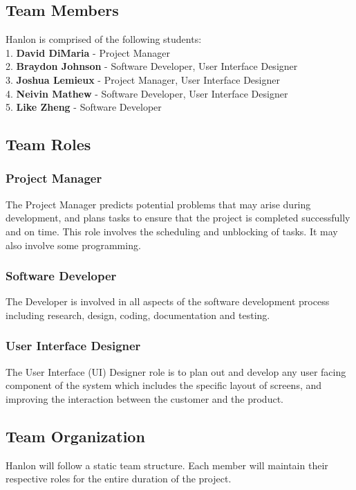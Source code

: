 \documentclass[12pt,letterpaper]{article}
\begin{document}
\subsection{Team Members}
Hanlon is comprised of the following students:\\
1. \textbf{\hspace*{5pt} David DiMaria} - Project Manager\\
2. \textbf{\hspace*{5pt}Braydon Johnson} - Software Developer, User Interface Designer\\
3. \textbf{\hspace*{5pt}Joshua Lemieux} - Project Manager, User Interface Designer\\
4. \textbf{\hspace*{5pt}Neivin Mathew} - Software Developer, User Interface Designer\\
5. \textbf{\hspace*{5pt}Like Zheng} - Software Developer

\subsection{Team Roles}
\subsubsection*{Project Manager}
The Project Manager predicts potential problems that may arise during development, and plans tasks to ensure that the project is completed successfully and on time. This role involves the scheduling and unblocking of tasks. It may also involve some programming.

\subsubsection*{Software Developer}
The Developer is involved in all aspects of the software development process including research, design, coding, documentation and testing.

\subsubsection*{User Interface Designer}
The User Interface (UI) Designer role is to plan out and develop any user facing component of the system which includes the specific layout of screens, and improving the interaction between the customer and the product.

\subsection{Team Organization}
Hanlon will follow a static team structure. Each member will maintain their respective roles for the entire duration of the project. \par
\end{document}
